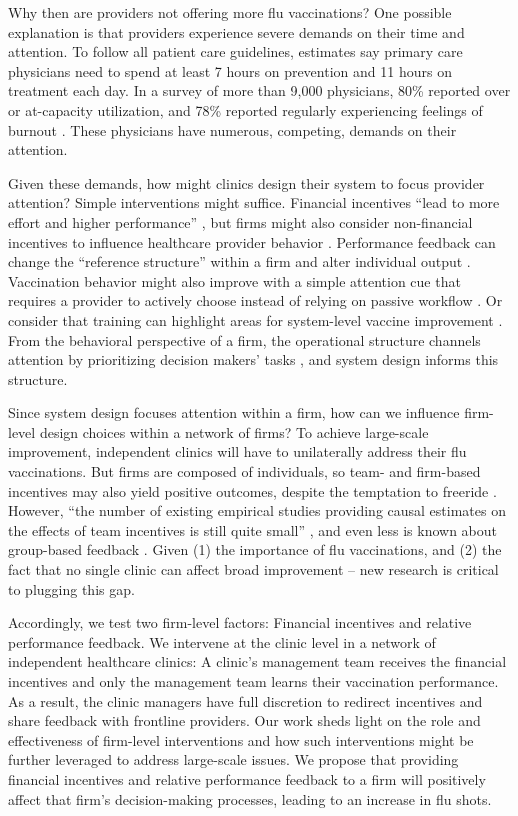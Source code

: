 \begin{onehalfspace}
 Why then are providers not offering more flu vaccinations? One possible explanation is that providers experience severe demands on their time and attention. To follow all patient care guidelines, estimates say primary care physicians need to spend at least 7 hours on prevention \citep{Yarnall2003} and 11 hours on treatment \citep{Ostbye2005} each day. In a survey of more than 9,000 physicians, 80\% reported over or at-capacity utilization, and 78\% reported regularly experiencing feelings of burnout \citep{ThePhysiciansFoundation2018}. These physicians have numerous, competing, demands on their attention.
 
 Given these demands, how might clinics design their system to focus provider attention? Simple interventions might suffice. Financial incentives “lead to more effort and higher performance” \citep[p. 191]{Gneezy2011}, but firms might also consider non-financial incentives to influence healthcare provider behavior \citep{Song2016,Jaeker2019}. Performance feedback can change the “reference structure” within a firm and alter individual output \citep{Roels2014}. Vaccination behavior might also improve with a simple attention cue that requires a provider to actively choose instead of relying on passive workflow \citep{Patel2017}. Or consider that training can highlight areas for system-level vaccine improvement \citep{Gilkey2014}. From the behavioral perspective of a firm, the operational structure channels attention by prioritizing decision makers’ tasks \citep{Simon1947,Hayes1988,Ocasio1997,Ocasio2018}, and system design informs this structure.
 
 Since system design focuses attention within a firm, how can we influence firm-level design choices within a network of firms? To achieve large-scale improvement, independent clinics will have to unilaterally address their flu vaccinations. But firms are composed of individuals, so team- and firm-based incentives may also yield positive outcomes, despite the temptation to freeride \citep{Bandiera2007,Friebel2017}. However, “the number of existing empirical studies providing causal estimates on the effects of team incentives is still quite small” \citep[p. 10]{Delfgaauw2020a}, and even less is known about group-based feedback  \citep[e.g.,][]{Delfgaauw2013}. Given (1) the importance of flu vaccinations, and (2) the fact that no single clinic can affect broad improvement – new research is critical to plugging this gap. 
 
 Accordingly, we test two firm-level factors: Financial incentives and relative performance feedback. We intervene at the clinic level in a network of independent healthcare clinics: A clinic’s management team receives the financial incentives and only the management team learns their vaccination performance. As a result, the clinic managers have full discretion to redirect incentives and share feedback with frontline providers. Our work sheds light on the role and effectiveness of firm-level interventions and how such interventions might be further leveraged to address large-scale issues. We propose that providing financial incentives and relative performance feedback to a firm will positively affect that firm’s decision-making processes, leading to an increase in flu shots.
 

\end{onehalfspace}
